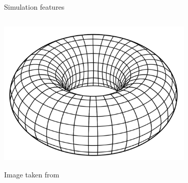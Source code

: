 \documentclass{beamer}
\begin{document}
\begin{frame}{Simulation features}
\begin{columns}
\begin{column}{0.5\textwidth}
    \begin{center}
     \includegraphics[width=0.7\textwidth]{Pic/Torus.png}
      \end{center}
      \begin{center}
          Image taken from \cite{PBC}
     \end{center}

\end{column}
\end{columns}
\end{frame}
\end{document}
